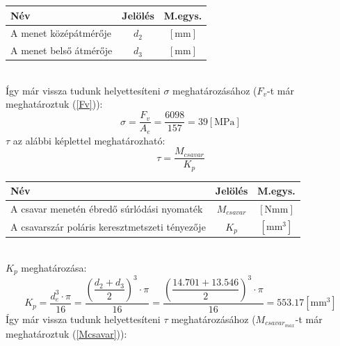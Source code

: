 \documentclass[10pt, a4paper]{article}
\newcommand{\mpa}{\mathrm{\left[MPa\right]}}
\newcommand{\mm}{\mathrm{\left[mm\right]}}
\newcommand{\mmh}{\mathrm{\left[mm^3\right]}}
\newcommand{\nmm}{\mathrm{\left[Nmm\right]}}
\begin{document}
				\vspace{-20pt}
					\renewcommand{\arraystretch}{1.4}
										\begin{table}[!h]
											\centering
											\begin{tabular}{l|c|c}
												\textbf{Név}                              & \textbf{Jelölés} & \textbf{M.egys.} \\ \hline
												A menet középátmérője                      & $d_2$                & $\mm$          \\
												A menet belső átmérője          & $d_3$                & $\mm$			 	 	       
											\end{tabular}
										\end{table}
					\renewcommand{\arraystretch}{1}\\
	Így már vissza tudunk helyettesíteni $\sigma$ meghatározásához ($F_v$-t már meghatároztuk (\ref{Fv})):
	\begin{equation}
			\sigma = \dfrac{F_v}{A_e} = \dfrac{6098}{157} = 39 \mpa\tag{6.1}
	\end{equation}
	$\tau$ az alábbi képlettel meghatározható:
	\begin{equation}
		\tau = \dfrac{M_{csavar}}{K_p} \tag{6.2}
	\end{equation}
					\vspace{-20pt}
						\renewcommand{\arraystretch}{1.4}
											\begin{table}[!h]
												\centering
												\begin{tabular}{l|c|c}
													\textbf{Név}                              & \textbf{Jelölés} & \textbf{M.egys.} \\ \hline
													A csavar menetén ébredő súrlódási nyomaték                      & $M_{csavar}$                & $\nmm$          \\
													A csavarszár poláris keresztmetszeti tényezője          & $K_p$                & $\mmh$			 	 	       
												\end{tabular}
											\end{table}
						\renewcommand{\arraystretch}{1}\\
	$K_p$ meghatározása:
	\begin{equation}
			K_p = \dfrac{d_e^3 \cdot \pi}{16} = \dfrac{\left(\dfrac{d_2 + d_3}{2}\right)^3 \cdot \pi}{16} = \dfrac{\left(\dfrac{14.701 + 13.546}{2}\right)^3 \cdot \pi}{16} = 553.17 \mmh\tag{6.2.1}
	\end{equation}
	Így már vissza tudunk helyettesíteni $\tau$ meghatározásához ($M_{csavar_{max}}$-t már meghatároztuk (\ref{Mcsavar})):
\end{document}
